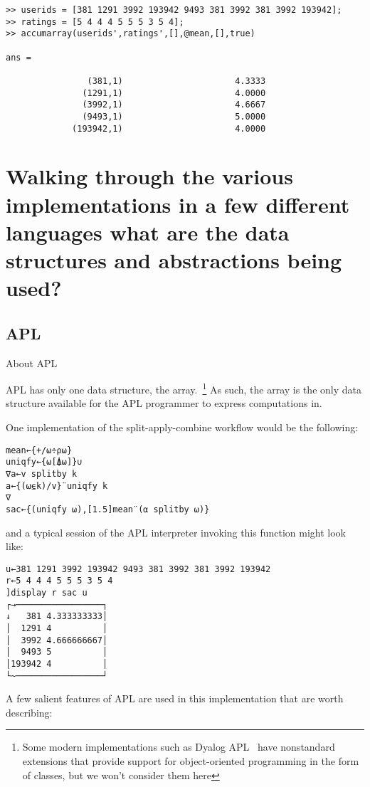 \documentclass[11pt]{asaproc}
\begin{document}
\begin{lstlisting}
>> userids = [381 1291 3992 193942 9493 381 3992 381 3992 193942];
>> ratings = [5 4 4 4 5 5 5 3 5 4];
>> accumarray(userids',ratings',[],@mean,[],true)

ans =

                (381,1)                      4.3333
               (1291,1)                      4.0000
               (3992,1)                      4.6667
               (9493,1)                      5.0000
             (193942,1)                      4.0000
\end{lstlisting}

\section{Walking through the various implementations in a few different languages
what are the data structures and abstractions being used?}

\subsection{APL}

About APL

APL has only one data structure, the array.~\footnote{Some modern implementations such as Dyalog APL~\cite{dyalog15} have nonstandard extensions that provide support for object-oriented programming in the form of classes, but we won't consider them here} As such, the array is the only data structure available for the APL programmer to express computations in.

One implementation of the split-apply-combine workflow would be the following:

\begin{lstlisting}[language=apl]
mean←{+/⍵÷⍴⍵}
uniqfy←{⍵[⍋⍵]}∪
∇a←v splitby k
a←{(⍵⍷k)/v}¨uniqfy k
∇
sac←{(uniqfy ⍵),[1.5]mean¨(⍺ splitby ⍵)}
\end{lstlisting}
%
and a typical session of the APL interpreter invoking this function might look like:

\begin{lstlisting}[language=apl]
u←381 1291 3992 193942 9493 381 3992 381 3992 193942
r←5 4 4 4 5 5 5 3 5 4
]display r sac u
┌→─────────────────┐
↓   381 4.333333333│
│  1291 4          │
│  3992 4.666666667│
│  9493 5          │
│193942 4          │
└~─────────────────┘
\end{lstlisting}

A few salient features of APL are used in this implementation that are worth describing:
\end{document}
